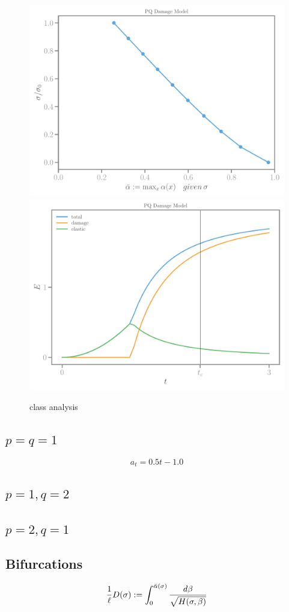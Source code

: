 \documentclass[]{article}
\begin{document}
\begin{figure}[htbp]
  \includegraphics[width=.33\textheight]{../figures/pq-maxalpha.pdf}
  \includegraphics[width=.33\textheight]{../figures/pq-energies-homog.pdf}
  \caption{class analysis}
  \label{fig:class-analyser}
\end{figure}


\subsection*{$p=q=1$}

$$
a_t = 0.5 t - 1.0
$$
\subsection*{$p=1, q=2$}
\subsection*{$p=2, q=1$}




\subsection*{Bifurcations}
$$
\frac{1}{\ell}D(\sigma) := \int_0^{\bar \alpha(\sigma)} \frac{d \beta}{\sqrt{H(\sigma, \beta)}}
$$
\end{document}
